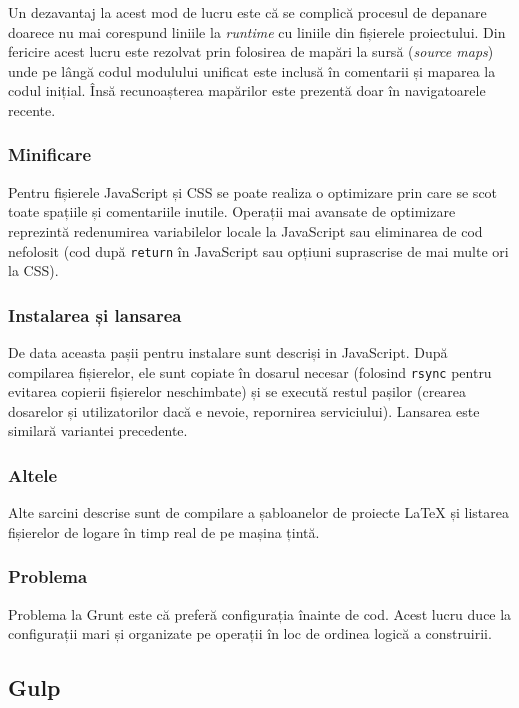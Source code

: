 \documentclass[a4wide,12pt]{report}
\newcommand{\eng}[1]{\emph{#1}} %
\newcommand{\cod}[1]{\texttt{#1}}
\begin{document}
Un dezavantaj la acest mod de lucru este că se complică procesul de depanare
doarece nu mai corespund liniile la \eng{runtime} cu liniile din fișierele
proiectului. Din fericire acest lucru este rezolvat prin folosirea de mapări la
sursă (\eng{source maps}) unde pe lângă codul modulului unificat este inclusă în
comentarii și maparea la codul inițial. Însă recunoașterea mapărilor este
prezentă doar în navigatoarele recente.

\subsubsection{Minificare}

Pentru fișierele JavaScript și CSS se poate realiza o optimizare prin care se
scot toate spațiile și comentariile inutile. Operații mai avansate de optimizare
reprezintă redenumirea variabilelor locale la JavaScript sau eliminarea de cod
nefolosit (cod după \cod{return} în JavaScript sau opțiuni suprascrise de mai
multe ori la CSS).

\subsubsection{Instalarea și lansarea}

De data aceasta pașii pentru instalare sunt descriși in JavaScript. După
compilarea fișierelor, ele sunt copiate în dosarul necesar (folosind \cod{rsync}
pentru evitarea copierii fișierelor neschimbate) și se execută restul pașilor
(crearea dosarelor și utilizatorilor dacă e nevoie, repornirea serviciului).
Lansarea este similară variantei precedente.

\subsubsection{Altele}

Alte sarcini descrise sunt de compilare a șabloanelor de proiecte \LaTeX{} și
listarea fișierelor de logare în timp real de pe mașina țintă.

\subsubsection{Problema}

Problema la Grunt este că preferă configurația înainte de cod. Acest lucru duce
la configurații mari și organizate pe operații în loc de ordinea logică a
construirii.

\subsection{Gulp}
\end{document}
